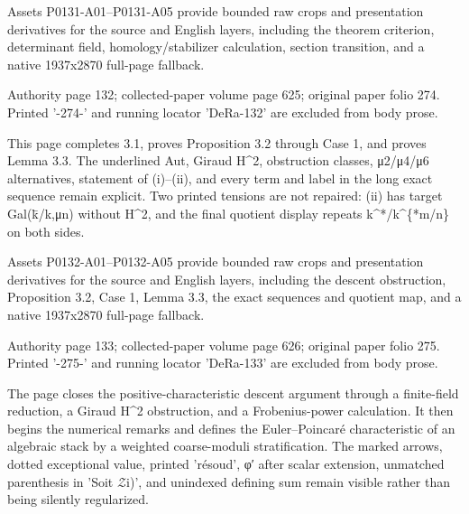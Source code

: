 \documentclass[11pt,a4paper]{article}
\begin{document}
Assets P0131-A01--P0131-A05 provide bounded raw crops and presentation derivatives for the source and English layers, including the theorem criterion, determinant field, homology/stabilizer calculation, section transition, and a native 1937x2870 full-page fallback.


\par\medskip
\hypertarget{D018-P0132}{}
\par\smallskip
Authority page 132; collected-paper volume page 625; original paper folio 274. Printed '-274-' and running locator 'DeRa-132' are excluded from body prose.

This page completes 3.1, proves Proposition 3.2 through Case 1, and proves Lemma 3.3. The underlined Aut, Giraud H\textasciicircum{}2, obstruction classes, μ\textunderscore{}2/μ\textunderscore{}4/μ\textunderscore{}6 alternatives, statement of (i)--(ii), and every term and label in the long exact sequence remain explicit. Two printed tensions are not repaired: (ii) has target Gal(k̄/k,μ\textunderscore{}n) without H\textasciicircum{}2, and the final quotient display repeats k\textasciicircum{}*/k\textasciicircum{}\{*m/n\} on both sides.

Assets P0132-A01--P0132-A05 provide bounded raw crops and presentation derivatives for the source and English layers, including the descent obstruction, Proposition 3.2, Case 1, Lemma 3.3, the exact sequences and quotient map, and a native 1937x2870 full-page fallback.


\par\medskip
\hypertarget{D018-P0133}{}
\par\smallskip
Authority page 133; collected-paper volume page 626; original paper folio 275. Printed '-275-' and running locator 'DeRa-133' are excluded from body prose.

The page closes the positive-characteristic descent argument through a finite-field reduction, a Giraud H\textasciicircum{}2 obstruction, and a Frobenius-power calculation. It then begins the numerical remarks and defines the Euler--Poincaré characteristic of an algebraic stack by a weighted coarse-moduli stratification. The marked arrows, dotted exceptional value, printed 'résoud', φ′ after scalar extension, unmatched parenthesis in 'Soit \ensuremath{\mathcal{Z}}\textunderscore{}i)', and unindexed defining sum remain visible rather than being silently regularized.
\end{document}
